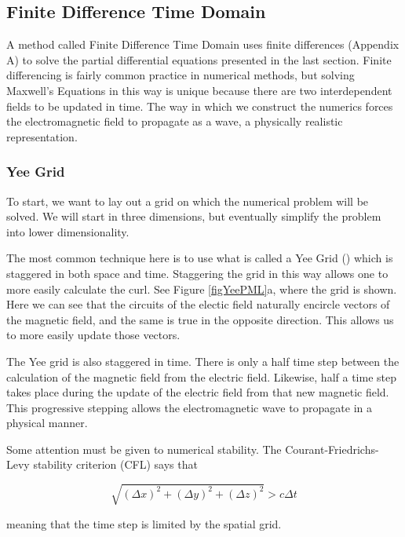 \documentclass[a4paper]{article}
\begin{document}
\subsection{Finite Difference Time Domain}

A method called Finite Difference Time Domain uses finite differences (Appendix A) to solve the partial differential equations presented in the last section. Finite differencing is fairly common practice in numerical methods, but solving Maxwell's Equations in this way is unique because there are two interdependent fields to be updated in time. The way in which we construct the numerics forces the electromagnetic field to propagate as a wave, a physically realistic
representation. 

\subsubsection{Yee Grid}

To start, we want to lay out a grid on which the numerical problem will be solved. We will start in three dimensions, but eventually simplify the problem into lower dimensionality.

The most common technique here is to use what is called a Yee Grid (\cite{Yee1966}) which is staggered in both space and time. Staggering the grid in this way allows one to more easily calculate the curl. See Figure \ref{figYeePML}a, where the grid is shown. Here we can see that the circuits of the electic field naturally encircle vectors of the magnetic field, and the same is true in the opposite direction. This allows us to more easily update those vectors. 

The Yee grid is also staggered in time. There is only a half time step between the calculation of the magnetic field from the electric field. Likewise, half a time step takes place during the update of the electric field from that new magnetic field. This progressive stepping allows the electromagnetic wave to propagate in a physical manner.

Some attention must be given to numerical stability. The Courant-Friedrichs-Levy stability criterion (CFL) says that 

\begin{equation}
    \sqrt{(\Delta x)^2 + (\Delta y)^2 + (\Delta z)^2} > c \Delta t
\end{equation}

meaning that the time step is limited by the spatial grid. 
\end{document}
